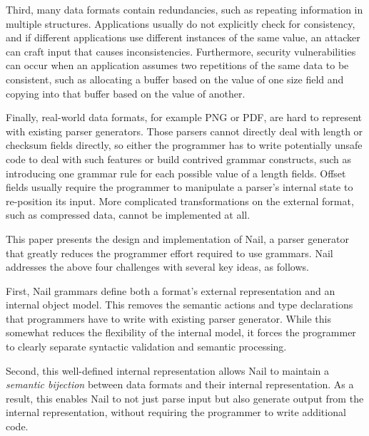Third, many data formats contain redundancies, such as repeating information in multiple structures.
Applications usually do not explicitly check for consistency, and if different applications use
different instances of the same value, an attacker can craft input that causes inconsistencies.
Furthermore, security vulnerabilities can occur when an application assumes two repetitions of the
same data to be consistent, such as allocating a buffer based on the value of one size field and copying into
that buffer based on the value of another.

Finally, real-world data formats, for example PNG or PDF,  are hard to represent with
existing parser generators. Those parsers cannot directly deal with length or checksum fields
directly, so either the programmer has to write potentially unsafe code to deal with such features
or build contrived grammar constructs, such as introducing one grammar rule for each possible value
of a length fields. Offset fields usually require the programmer to manipulate a parser's internal
state to re-position its input. More complicated transformations on the external format, such as
compressed data, cannot be implemented at all.



This paper presents the design and implementation of Nail, a parser generator that greatly reduces
the programmer effort required to use grammars. Nail addresses the above four challenges with
several key ideas, as follows.

First, Nail grammars define both a format's external representation and an internal object model.
This removes the semantic actions and type declarations that programmers have to write with existing
parser generator. While this somewhat reduces the flexibility of the internal model, it forces the programmer
to clearly separate syntactic validation and semantic processing.

Second, this well-defined internal representation allows Nail to
maintain a {\em semantic bijection} between data formats and their
internal representation.  As a result, this enables Nail to not just
parse input but also generate output from the internal representation,
without requiring the programmer to write additional code.



